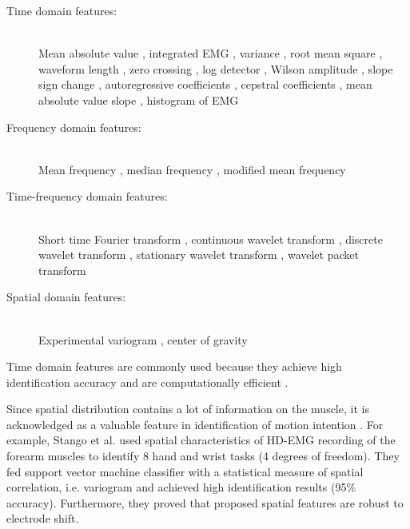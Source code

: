 \begin{description}
\item[Time domain features:] \hfill \\
Mean absolute value \citep{Hudgins1993}, integrated EMG \citep{Park1998}, variance \citep{Park1998, Zardoshti1995}, root mean square \citep{Farrell2008}, waveform length \citep{Hudgins1993}, zero crossing \citep{Hudgins1993}, log detector \citep{Tkach2010}, Wilson amplitude \citep{Zardoshti1995}, slope sign change \citep{Hudgins1993}, autoregressive coefficients \citep{Hargrove2007}, cepstral coefficients \citep{Park1998}, mean absolute value slope \citep{Phinyomark2012}, histogram of EMG \citep{Phinyomark2012, Zardoshti1995}
\item[Frequency domain features:] \hfill \\
Mean frequency \citep{Phinyomark2012b}, median frequency \citep{Phinyomark2012b}, modified mean frequency \citep{Phinyomark2009}
\item[Time-frequency domain features:] \hfill \\
Short time Fourier transform \citep{Englehart2003b, Englehart2001}, continuous wavelet transform \citep{Englehart2003b, Englehart2001}, discrete wavelet transform \citep{Englehart2003b}, stationary wavelet transform \citep{Englehart2003b}, wavelet packet transform \citep{Englehart2003b, Englehart2001, Chu2006}
\item[Spatial domain features:] \hfill \\
Experimental variogram \citep{Stango2015}, center of gravity \citep{Rojas-Martinez2012, Rojas-Martinez2013}
\end{description}

Time domain features are commonly used because they achieve high identification accuracy and are computationally efficient \citep{Hakonen2015}.

Since spatial distribution contains a lot of information on the muscle, it is acknowledged as a valuable feature in identification of motion intention \citep{Stango2015, Hakonen2015, Rojas-Martinez2013}. For example, Stango et al. \citep{Stango2015} used spatial characteristics of HD-EMG recording of the forearm muscles to identify 8 hand and wrist tasks (4 degrees of freedom). They fed support vector machine classifier with a statistical measure of spatial correlation, i.e. variogram and achieved high identification results (95\% accuracy). Furthermore, they proved that proposed spatial features are robust to electrode shift.

